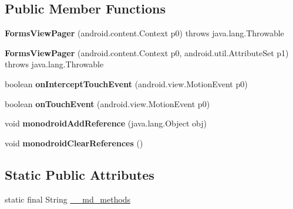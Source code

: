 \subsection*{Public Member Functions}
\begin{DoxyCompactItemize}
\item 
\mbox{\label{classmd5270abb39e60627f0f200893b490a1ade_1_1FormsViewPager_a1e733ee4a3786f4f7bd543951206fb73}} 
{\bfseries Forms\+View\+Pager} (android.\+content.\+Context p0)  throws java.\+lang.\+Throwable 	
\item 
\mbox{\label{classmd5270abb39e60627f0f200893b490a1ade_1_1FormsViewPager_ab7dadec2523ca0ad6456f61a31fbe5c9}} 
{\bfseries Forms\+View\+Pager} (android.\+content.\+Context p0, android.\+util.\+Attribute\+Set p1)  throws java.\+lang.\+Throwable 	
\item 
\mbox{\label{classmd5270abb39e60627f0f200893b490a1ade_1_1FormsViewPager_a1ad288fa95e598ccb5cf989878fa5bbf}} 
boolean {\bfseries on\+Intercept\+Touch\+Event} (android.\+view.\+Motion\+Event p0)
\item 
\mbox{\label{classmd5270abb39e60627f0f200893b490a1ade_1_1FormsViewPager_a48682b3406ea863f47698921ff4bb49e}} 
boolean {\bfseries on\+Touch\+Event} (android.\+view.\+Motion\+Event p0)
\item 
\mbox{\label{classmd5270abb39e60627f0f200893b490a1ade_1_1FormsViewPager_afd06d43e627d980375c67e56e0606283}} 
void {\bfseries monodroid\+Add\+Reference} (java.\+lang.\+Object obj)
\item 
\mbox{\label{classmd5270abb39e60627f0f200893b490a1ade_1_1FormsViewPager_a53b751fba028a911988261b0a536d2ab}} 
void {\bfseries monodroid\+Clear\+References} ()
\end{DoxyCompactItemize}
\subsection*{Static Public Attributes}
\begin{DoxyCompactItemize}
\item 
static final String \hyperlink{classmd5270abb39e60627f0f200893b490a1ade_1_1FormsViewPager_a0afe4852089db54f50fdcd4673a3538f}{\+\_\+\+\_\+md\+\_\+methods}
\end{DoxyCompactItemize}
